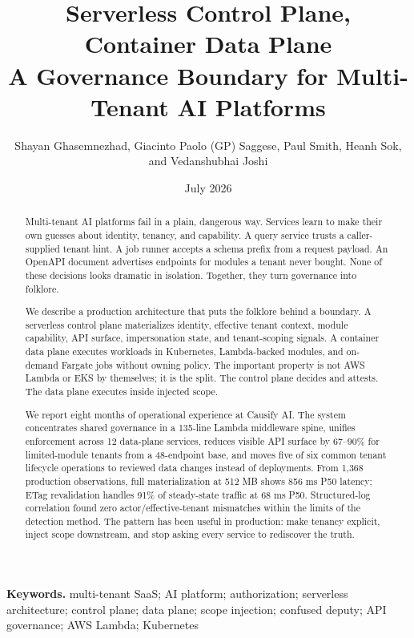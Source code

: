 \documentclass[11pt, reqno]{amsart}
\title[Serverless Control Plane]{Serverless Control Plane, Container Data Plane\\
\large A Governance Boundary for Multi-Tenant AI Platforms}
\author[Ghasemnezhad et al.]{Shayan Ghasemnezhad, Giacinto Paolo (GP) Saggese, Paul Smith, Heanh Sok, and Vedanshubhai Joshi}
\date{July 2026}
\newcommand{\code}[1]{\texttt{\detokenize{#1}}}
\begin{document}
\begin{abstract}
Multi-tenant AI platforms fail in a plain, dangerous way. Services learn to make their own guesses about identity, tenancy, and capability. A query service trusts a caller-supplied tenant hint. A job runner accepts a schema prefix from a request payload. An OpenAPI document advertises endpoints for modules a tenant never bought. None of these decisions looks dramatic in isolation. Together, they turn governance into folklore.

We describe a production architecture that puts the folklore behind a boundary. A serverless control plane materializes identity, effective tenant context, module capability, API surface, impersonation state, and tenant-scoping signals. A container data plane executes workloads in Kubernetes, Lambda-backed modules, and on-demand Fargate jobs without owning policy. The important property is not AWS Lambda or EKS by themselves; it is the split. The control plane decides and attests. The data plane executes inside injected scope.

We report eight months of operational experience at Causify AI. The system concentrates shared governance in a 135-line Lambda middleware spine, unifies enforcement across 12 data-plane services, reduces visible API surface by 67--90\% for limited-module tenants from a 48-endpoint base, and moves five of six common tenant lifecycle operations to reviewed data changes instead of deployments. From 1,368 production observations, full \code{/v2/me} materialization at 512 MB shows 856 ms P50 latency; ETag revalidation handles 91\% of steady-state traffic at 68 ms P50. Structured-log correlation found zero actor/effective-tenant mismatches within the limits of the detection method. The pattern has been useful in production: make tenancy explicit, inject scope downstream, and stop asking every service to rediscover the truth.
\end{abstract}

\maketitle
{}

\noindent\textbf{Keywords.} multi-tenant SaaS; AI platform; authorization; serverless architecture; control plane; data plane; scope injection; confused deputy; API governance; AWS Lambda; Kubernetes

\setcounter{tocdepth}{1}
\tableofcontents
\end{document}
